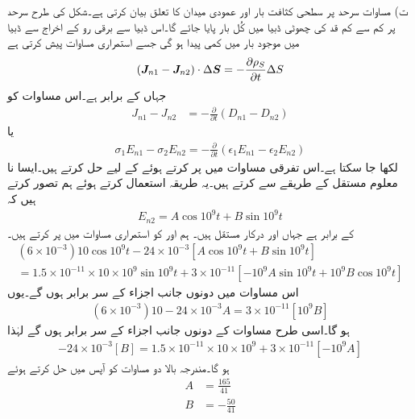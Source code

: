 ت) مساوات  سرحد پر سطحی کثافت بار  اور عمودی میدان کا تعلق بیان کرتی ہے۔شکل  کی طرح سرحد پر کم سے کم قد  کی چھوٹی ڈبیا میں کُل  بار پایا جائے گا۔اس ڈبیا سے برقی رو کے اخراج سے ڈبیا میں موجود بار میں کمی پیدا ہو گی جسے استمراری مساوات پیش کرتی ہے
\begin{align*}
({{\boldsymbol{J}}}_{n1}-{{\boldsymbol{J}}}_{n2}) \cdot \Delta {\ensuremath{{\boldsymbol{S}}}} = -\frac{\partial \rho_S}{\partial t} \Delta S
\end{align*}
جہاں  کے برابر ہے۔اس  مساوات کو 
\begin{align*}
J_{n1}-J_{n2}&=-\frac{\partial}{\partial t} (D_{n1}-D_{n2})
\end{align*}
یا
\begin{align*}
\sigma_1 E_{n1}-\sigma_2 E_{n2}=-\frac{\partial }{\partial t} (\epsilon_1 E_{n1}-\epsilon_2 E_{n2})
\end{align*}
لکھا جا سکتا ہے۔اس تفرقی مساوات میں  پر کرتے ہوئے  کے لیے حل کرتے ہیں۔ایسا نا معلوم مستقل کے طریقے سے کرتے ہیں۔یہ طریقہ استعمال کرتے ہوئے ہم تصور کرتے ہیں کہ
\begin{align*}
E_{n2}=A \cos 10^9 t + B \sin 10^9 t
\end{align*}
کے برابر ہے جہاں  اور  درکار مستقل ہیں۔ ہم  اور  کو استمراری مساوات میں پر کرتے ہیں۔
\begin{multline*}
(6\times 10^{-3}) 10 \cos 10^9 t -24\times 10^{-3} [A \cos 10^9 t +B \sin 10^9 t]\\
=1.5\times 10^{-11} \times 10 \times 10^9 \sin 10^9 t+3\times 10^{-11}[-10^9 A \sin 10^9 t +10^9 B \cos 10^9 t ]
\end{multline*}
اس مساوات میں دونوں جانب  اجزاء کے سر برابر ہوں گے۔یوں
\begin{align*}
(6\times 10^{-3}) 10 -24 \times 10^{-3}A = 3\times 10^{-11} [10^9 B]
\end{align*}
ہو گا۔اسی طرح مساوات کے دونوں جانب  اجزاء کے سر برابر ہوں گے لہٰذا
\begin{align*}
-24\times 10^{-3}[B]=1.5\times 10^{-11} \times 10 \times 10^9+3\times 10^{-11}[-10^9 A]
\end{align*}
ہو گا۔مندرجہ بالا دو مساوات کو آپس میں حل کرتے ہوئے
\begin{align*}
A&=\frac{165}{41}\\
B&=-\frac{50}{41}
\end{align*}
